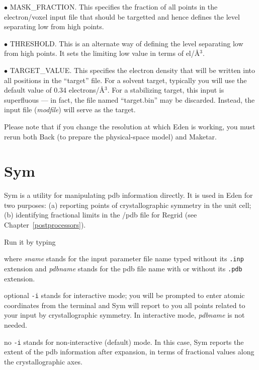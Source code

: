 \documentclass{report}
\begin{document}
{$\bullet$ MASK\_FRACTION.  
This specifies the fraction of all points in the 
electron/voxel input file that should be targetted 
and hence defines the level separating low from high points.

$\bullet$ THRESHOLD.
  This is an alternate way of defining the level 
separating low from high points.  It sets the limiting low value 
in terms of el/\AA$^3$. 

$\bullet$ TARGET\_VALUE.
  This specifies the electron density that will be
written into all positions in the ``target'' file.
For a solvent target, typically you will use the default value 
of 0.34 electrons/\AA$^3$.
For a stabilizing target, this input is superfluous --- in fact, 
the file named ``target.bin'' may be discarded.
Instead, the input file ({\it modfile}) will serve as the target.

\vspace {0.1in}

Please note that if you change the resolution at which Eden is working, 
you must rerun both Back (to prepare the physical-space model) 
and Maketar.


\section {Sym}
\label{preprocessors-sym}

Sym is a utility for manipulating pdb information directly.  It is
used in Eden for two purposes: (a) reporting points of crystallographic 
symmetry in the unit cell; 
(b) identifying fractional limits in the /pdb 
file for Regrid (see Chapter~\ref{postprocessors}).

Run it by typing 


where {\it sname} stands for the input parameter file name typed without 
its {\tt .inp} extension and {\it pdbname} stands
 for the pdb file name with or without its {\tt .pdb} extension.  

\qq optional {\tt -i} stands for interactive mode; you
will be prompted to enter atomic coordinates from the terminal
and Sym will report to you all points related to your input by 
crystallographic
symmetry.  In interactive mode, {\it pdbname} is not needed.

\qq no {\tt -i} stands for non-interactive (default) mode.  In this case,
Sym reports the
extent of the pdb information after expansion, in terms of fractional values
along the crystallographic axes.

}
\end{document}
